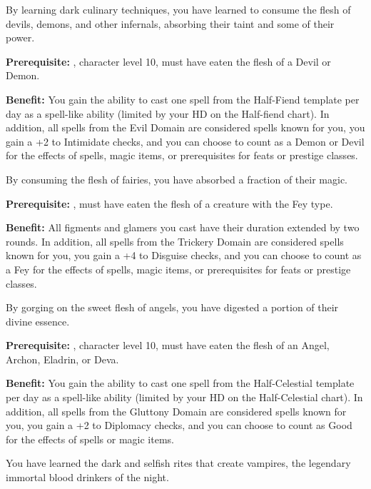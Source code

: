 
By learning dark culinary techniques, you have learned to consume the flesh of devils, demons, and other infernals, absorbing their taint and some of their power.

\textbf{Prerequisite:} , character level 10, must have eaten the flesh of a Devil or Demon.

\textbf{Benefit:} You gain the ability to cast one spell from the Half-Fiend template per day as a spell-like ability (limited by your HD on the Half-fiend chart). In addition, all spells from the Evil Domain are considered spells known for you, you gain a +2 to Intimidate checks, and you can choose to count as a Demon or Devil for the effects of spells, magic items, or prerequisites for feats or prestige classes.


By consuming the flesh of fairies, you have absorbed a fraction of their magic.

\textbf{Prerequisite:} , must have eaten the flesh of a creature with the Fey type.

\textbf{Benefit:} All figments and glamers you cast have their duration extended by two rounds. In addition, all spells from the Trickery Domain are considered spells known for you, you gain a +4 to Disguise checks, and you can choose to count as a Fey for the effects of spells, magic items, or prerequisites for feats or prestige classes.


By gorging on the sweet flesh of angels, you have digested a portion of their divine essence.

\textbf{Prerequisite:} , character level 10, must have eaten the flesh of an Angel, Archon, Eladrin, or Deva.

\textbf{Benefit:} You gain the ability to cast one spell from the Half-Celestial template per day as a spell-like ability (limited by your HD on the Half-Celestial chart). In addition, all spells from the Gluttony Domain are considered spells known for you, you gain a +2 to Diplomacy checks, and you can choose to count as Good for the effects of spells or magic items.


You have learned the dark and selfish rites that create vampires, the legendary immortal blood drinkers of the night.

